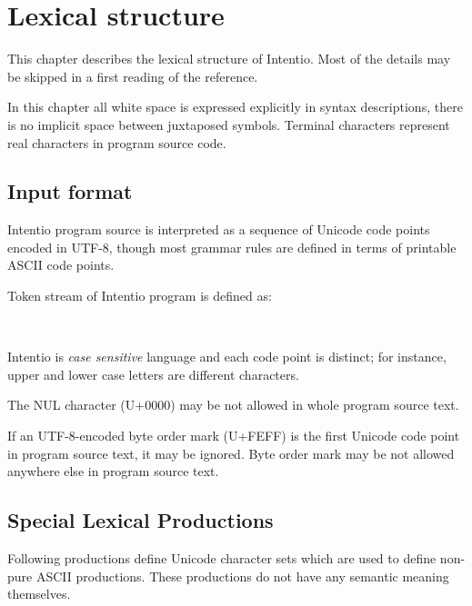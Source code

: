 \chapter{Lexical structure}

This chapter describes the lexical structure of Intentio. Most of the details may be skipped in a first reading of the reference.

In this chapter all white space is expressed explicitly in syntax descriptions, there is no implicit space between juxtaposed symbols. Terminal characters represent real characters in program source code.

\section{Input format}

Intentio program source is interpreted as a sequence of Unicode code points encoded in UTF-8, though most grammar rules are defined in terms of printable ASCII code points.

Token stream of Intentio program is defined as:

\begin{bnf}
   \eq {} \  \\
        \eq  {}
                  \gor {}
                  \gor {}
                  \gor {}
                  \gor {}
\end{bnf}

Intentio is \emph{case sensitive} language and each code point is distinct; for instance, upper and lower case letters are different characters.

The NUL character (U+0000) may be not allowed in whole program source text.

If an UTF-8-encoded byte order mark (U+FEFF) is the first Unicode code point in program source text, it may be ignored. Byte order mark may be not allowed anywhere else in program source text.

\section{Special Lexical Productions}

Following productions define Unicode character sets which are used to define non-pure ASCII productions. These productions do not have any semantic meaning themselves.

